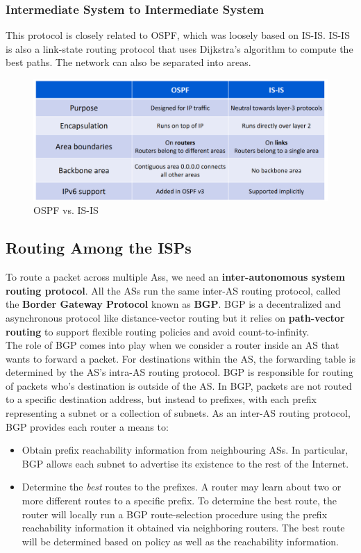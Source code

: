 \subsubsection{Intermediate System to Intermediate System}
This protocol is closely related to OSPF, which was loosely based on IS-IS. IS-IS is also a link-state routing protocol that uses Dijkstra's algorithm to compute the best paths. The network can also be separated into areas.
\begin{figure}
\centering
\includegraphics[width=.8\textwidth]{images/ospfvisis.PNG}
\caption{OSPF vs. IS-IS}
\label{ospfvisis}
\end{figure}

\subsection{Routing Among the ISPs}
To route a packet across multiple Ass, we need an \textbf{inter-autonomous system routing protocol}. All the ASs run the same inter-AS routing protocol, called the \textbf{Border Gateway Protocol} known as \textbf{BGP}. BGP is a decentralized and asynchronous protocol like distance-vector routing but it relies on \textbf{path-vector routing} to support flexible routing policies and avoid count-to-infinity.\vspace{.3cm}\\
The role of BGP comes into play when we consider a router inside an AS that wants to forward a packet. For destinations within the AS, the forwarding table is determined by the AS's intra-AS routing protocol. BGP is responsible for routing of packets who's destination is outside of the AS. In BGP, packets are not routed to a specific destination address, but instead to prefixes, with each prefix representing a subnet or a collection of subnets. As an inter-AS routing protocol, BGP provides each router a means to:
\begin{itemize}
\item Obtain prefix reachability information from neighbouring ASs. In particular, BGP allows each subnet to advertise its existence to the rest of the Internet. 
\item Determine the \textit{best} routes to the prefixes. A router may learn about two or more different routes to a specific prefix. To determine the best route, the router will locally run a BGP route-selection procedure using the prefix reachability information it obtained via neighboring routers. The best route will be determined based on policy as well as the reachability information.
\end{itemize}

